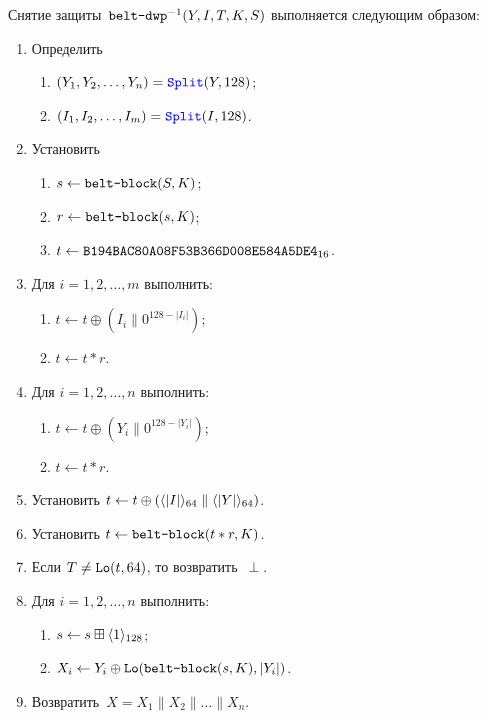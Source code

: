 Снятие защиты~$\texttt{belt-dwp}^{-1}(Y,I,T,K,S)$ выполняется следующим образом:
\begin{enumerate}
\item
Определить 
\begin{enumerate}
\item
$(Y_1,Y_2,\ldots,Y_n)=\mathop{\textcolor{blue}{\texttt{Split}}}\nolimits(Y, 128)$;
\item
$(I_1,I_2,\ldots,I_m)=\mathop{\textcolor{blue}{\texttt{Split}}}\nolimits(I, 128)$. 
\end{enumerate}
\item
Установить
\begin{enumerate}
\item
$s\leftarrow\texttt{belt-block}(S,K)$;
\item
$r\leftarrow \texttt{belt-block}(s,K)$;
\item
$t\leftarrow\texttt{B194BAC80A08F53B366D008E584A5DE4}_{16}$.
\end{enumerate}

\item
Для $i=1,2,\ldots,m$ выполнить:
\begin{enumerate}
\item
$t\leftarrow t\oplus (I_i\parallel 0^{128-|I_i|})$;
\item
$t\leftarrow t\ast r$.
\end{enumerate}

\item\label{Step.AE.DWP.StepA}
Для $i=1,2,\ldots,n$ выполнить:
\begin{enumerate}
\item
$t\leftarrow t\oplus (Y_i\parallel 0^{128-|Y_i|})$;
\item
$t\leftarrow t\ast r$.
\end{enumerate}

\item
Установить
$t\leftarrow t\oplus 
(\langle|I|\rangle_{64}\parallel\langle|Y|\rangle_{64})$.

\item
Установить
$t\leftarrow \texttt{belt-block}(t\ast r,K)$.

\item\label{Step.AE.DWP.VerifyMAC}
Если $T\neq \mathop{\texttt{Lo}}\nolimits(t, 64)$, то возвратить~$\perp$.

\item\label{Step.AE.DWP.StepD}
Для $i=1,2,\ldots,n$ выполнить:
\begin{enumerate}
\item
$s\leftarrow s\boxplus\langle1\rangle_{128}$;
\item
$X_i\leftarrow Y_i\oplus \mathop{\texttt{Lo}}\nolimits(\texttt{belt-block}(s,K),|Y_i|)$.
\end{enumerate}

\item
Возвратить~$X=X_1\parallel X_2\parallel\ldots\parallel X_n$.
\end{enumerate}


